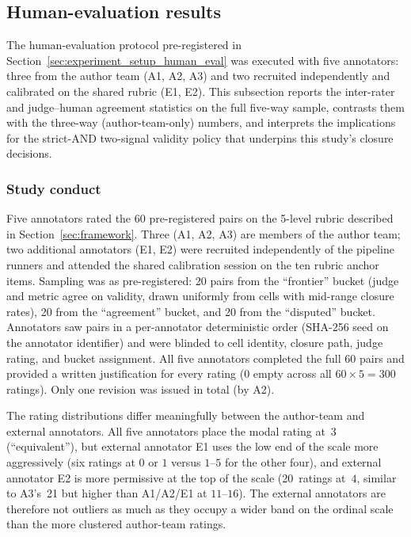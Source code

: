 \subsection{Human-evaluation results}
\label{sec:results_human_eval}

The human-evaluation protocol pre-registered in
Section~\ref{sec:experiment_setup_human_eval} was executed with five
annotators: three from the author team (A1, A2, A3) and two recruited
independently and calibrated on the shared rubric (E1, E2). This
subsection reports the inter-rater and judge--human agreement
statistics on the full five-way sample, contrasts them with the
three-way (author-team-only) numbers, and interprets the implications
for the strict-AND two-signal validity policy that underpins this
study's closure decisions.

\subsubsection{Study conduct}
\label{sec:human_eval_conduct}

Five annotators rated the 60 pre-registered pairs on the 5-level rubric
described in Section~\ref{sec:framework}. Three (A1, A2, A3) are members
of the author team; two additional annotators (E1, E2) were recruited
independently of the pipeline runners and attended the shared calibration
session on the ten rubric anchor items. Sampling was as pre-registered:
20 pairs from the ``frontier'' bucket (judge and metric agree on
validity, drawn uniformly from cells with mid-range closure rates), 20
from the ``agreement'' bucket, and 20 from the ``disputed'' bucket.
Annotators saw pairs in a per-annotator deterministic order (SHA-256
seed on the annotator identifier) and were blinded to cell identity,
closure path, judge rating, and bucket assignment. All five annotators
completed the full 60 pairs and provided a written justification for
every rating (0 empty across all $60 \times 5 = 300$ ratings). Only
one revision was issued in total (by A2).

The rating distributions differ meaningfully between the author-team and
external annotators. All five annotators place the modal rating at~3
(``equivalent''), but external annotator E1 uses the low end of the
scale more aggressively (six ratings at $0$ or $1$ versus $1$--$5$ for
the other four), and external annotator E2 is more permissive at the
top of the scale (20~ratings at~$4$, similar to A3's~21 but higher than
A1/A2/E1 at $11$--$16$). The external annotators are therefore not
outliers as much as they occupy a wider band on the ordinal scale than
the more clustered author-team ratings.


